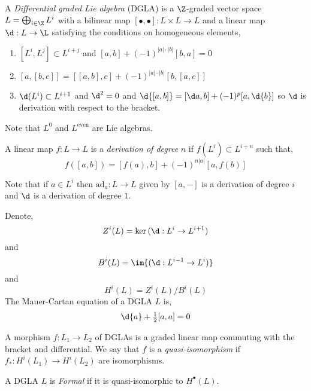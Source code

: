 \documentclass[12pt]{article}
\begin{document}
\begin{defn}
A \textit{Differential graded Lie algebra} (DGLA) is a $\Z$-graded vector space $L = \bigoplus_{i \in \Z} L^i$ with a bilinear map $[\bullet, \bullet] : L \times L \to L$ and a linear map $\d : L \to \L$ satisfying the conditions on homogeneous elements,
\begin{enumerate}
\item $[L^i, L^j] \subset L^{i+j}$ and $[a,b] + (-1)^{|a|\cdot |b|}[b,a] = 0$
\item $[a,[b,c]] = [[a,b], c] + (-1)^{|a|\cdot|b|} [b, [a,c]]$
\item $\d(L^i) \subset L^{i+1}$ and $\d^2 = 0$ and $\d{[a,b]} = [\d a, b] + (-1)^p [a, \d{b}]$ so $\d$ is derivation with respect to the bracket.
\end{enumerate}
\end{defn}

\begin{rmk}
Note that $L^0$ and $L^{\text{even}}$ are Lie algebras.
\end{rmk}

\begin{defn}
A linear map $f : L \to L$ is a \textit{derivation of degree} $n$ if $f(L^i) \subset L^{i+n}$ such that,
\[ f([a,b]) = [f(a), b] + (-1)^{n |a|} [a, f(b)] \]
\end{defn}

\newcommand{\ad}{\mathrm{ad}}

\begin{rmk}
Note that if $a \in L^i$ then $\ad_a : L \to L$ given by $[a, -]$ is a derivation of degree $i$ and $\d$ is a derivation of degree $1$.
\end{rmk}

\begin{defn}
Denote,
\[ Z^i(L) = \ker{(\d : L^i \to L^{i+1})} \]
and
\[ B^i(L) = \im{(\d : L^{i-1} \to L^i)} \]
and
\[ H^i(L) = Z^i(L)/B^i(L) \]
The Mauer-Cartan equation of a DGLA $L$ is,
\[ \d{a} + \tfrac{1}{2} [a,a] = 0 \]
\end{defn}

\begin{defn}
A morphism $f : L_1 \to L_2$ of DGLAs is a graded linear map commuting with the bracket and differential. We say that $f$ is a \textit{quasi-isomorphism} if $f_* : H^i(L_1) \to H^i(L_2)$ are isomorphisms.
\end{defn}

\begin{defn}
A DGLA $L$ is \textit{Formal} if it is quasi-isomorphic to $H^\bullet(L)$.
\end{defn}
\end{document}

